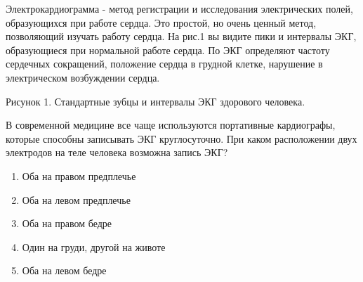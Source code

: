 
Электрокардиограмма - метод
регистрации и исследования электрических полей, образующихся при работе сердца.
Это простой, но очень ценный метод, позволяющий изучать работу сердца. На рис.1
вы видите пики и интервалы ЭКГ, образующиеся при нормальной работе сердца. По
ЭКГ определяют частоту сердечных сокращений, положение сердца в грудной клетке,
нарушение в электрическом возбуждении сердца.


Рисунок 1. Стандартные зубцы и интервалы ЭКГ здорового человека.

В современной
медицине все чаще используются портативные кардиографы, которые способны
записывать ЭКГ круглосуточно. При каком расположении двух электродов на теле
человека возможна запись ЭКГ?

\begin{enumerate}
    \item Оба на правом предплечье
    \item Оба на левом предплечье
    \item Оба на правом бедре
    \item Один на груди, другой на животе
    \item Оба на левом бедре
\end{enumerate}

